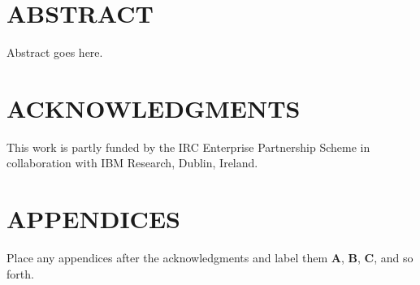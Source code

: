 \documentclass{wscpaperproc}
\theoremstyle{wsc}
\begin{document}

\maketitle

\section*{ABSTRACT}
Abstract goes here.  








\section*{ACKNOWLEDGMENTS}
This work is partly funded by the IRC Enterprise Partnership Scheme in collaboration with IBM Research, Dublin, Ireland.

\appendix
\section{APPENDICES} \label{app:quadratic}
Place any appendices after the acknowledgments and label them
\textbf{A}, \textbf{B}, \textbf{C}, and so forth.
\end{document}
